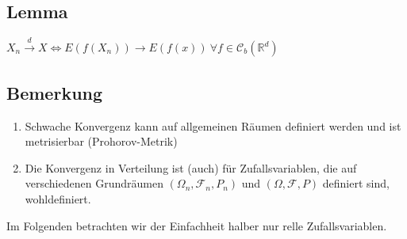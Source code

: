 \documentclass[german,10pt,oneside, fleqn, a4paper]{article}
\newcommand {\R}	{\mathbb{R}}
\newcommand{\LRa}{\Leftrightarrow}
\newcommand{\ra}{\rightarrow}
\newcommand{\brc}[1]{\left(#1\right)}
\newcommand{\mc}[1]{\mathcal{#1}}
\newcommand{\1}[1]{1_{#1}}
\newcommand{\2}[1]{\1{\brac{#1}}}
\newcommand{\xr}[2][]{\xrightarrow[#1]{#2}}
\newcommand{\cb}[1][d]{\mc{C}_b\brc{\R^{#1}}}
\newcommand{\raum}{\brc{\Omega,\mc{F},P}}
\newcommand{\f}{\mc{F}}
\begin{document}
\subsection{Lemma}
$X_n\xr{d}X\LRa E(f(X_n))\ra E(f(x))\ \forall f\in\cb{}$

\subsection{Bemerkung}
\begin{enumerate}[label=(\alph*)]
\item Schwache Konvergenz kann auf allgemeinen Räumen definiert werden und ist metrisierbar (Prohorov-Metrik)
\item Die Konvergenz in Verteilung ist (auch) für Zufallsvariablen, die auf verschiedenen Grundräumen $(\Omega_n,\f_n,P_n)$ und $\raum$ definiert sind, wohldefiniert.
\end{enumerate}
Im Folgenden betrachten wir der Einfachheit halber nur relle Zufallsvariablen.
\end{document}
